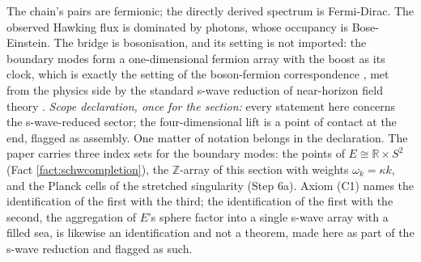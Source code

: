 \documentclass[11pt]{article}
\theoremstyle{definition}
\newcommand{\R}{\mathbb{R}}
\begin{document}
The chain's pairs are fermionic; the directly derived spectrum is Fermi-Dirac. The observed Hawking flux is dominated by photons, whose occupancy is Bose-Einstein. The bridge is bosonisation, and its setting is not imported: the boundary modes form a one-dimensional fermion array with the boost as its clock, which is exactly the setting of the boson-fermion correspondence \cite{PressleySegal1986}, met from the physics side by the standard s-wave reduction of near-horizon field theory \cite{RW2005}. \emph{Scope declaration, once for the section:} every statement here concerns the s-wave-reduced sector; the four-dimensional lift is a point of contact at the end, flagged as assembly. One matter of notation belongs in the declaration. The paper carries three index sets for the boundary modes: the points of $E \cong \R \times S^{2}$ (Fact \ref{fact:schwcompletion}), the $\mathbb{Z}$-array of this section with weights $\omega_k = \kappa k$, and the Planck cells of the stretched singularity (Step 6a). Axiom (C1) names the identification of the first with the third; the identification of the first with the second, the aggregation of $E$'s sphere factor into a single s-wave array with a filled sea, is likewise an identification and not a theorem, made here as part of the s-wave reduction and flagged as such.
\end{document}
